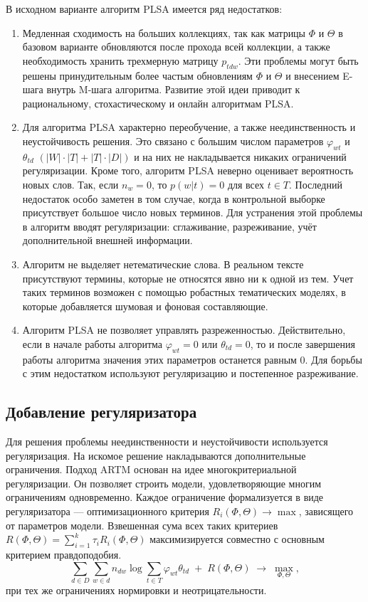 \documentclass[12pt]{article}
\renewcommand{\phi}{\varphi}
\begin{document}
В исходном варианте алгоритм PLSA имеется ряд недостатков:
\begin{enumerate}
\item Медленная сходимость на больших коллекциях, так как матрицы $\Phi$ и $\Theta$ в базовом варианте обновляются после прохода всей коллекции, а также необходимость хранить трехмерную матрицу $p_{tdw}$. Эти проблемы могут быть решены принудительным более частым обновлениям $\Phi$ и $\Theta$ и внесением E-шага внутрь M-шага алгоритма. Развитие этой идеи приводит к рациональному, стохастическому и онлайн алгоритмам PLSA.
\item Для алгоритма PLSA характерно переобучение, а также неединственность и неустойчивость решения. Это связано с большим числом параметров $\phi_{wt}$ и $\theta_{td}$ $(|W|\cdot|T|+|T|\cdot|D|)$ и на них не накладывается никаких ограничений регуляризации. Кроме того, алгоритм PLSA неверно оценивает вероятность новых слов. Так, если $n_w=0$, то $p(w|t)=0$ для всех  $t \in T$. Последний недостаток особо заметен в том случае, когда в контрольной выборке присутствует большое число новых терминов. Для устранения этой проблемы в алгоритм вводят регуляризации: сглаживание, разреживание, учёт дополнительной внешней информации.
\item Алгоритм не выделяет нетематические слова. В реальном тексте присутствуют термины, которые не относятся явно ни к одной из тем. Учет таких терминов возможен с помощью робастных тематических моделях, в которые добавляется шумовая и фоновая составляющие.
\item Алгоритм PLSA не позволяет управлять разреженностью. Действительно, если в начале работы алгоритма $\phi_{wt} = 0$ или $\theta_{td} = 0$, то и после завершения работы алгоритма значения этих параметров останется равным 0. Для борьбы с этим недостатком используют регуляризацию и постепенное разреживание.
\end{enumerate}
	\subsection{Добавление регуляризатора}
Для решения проблемы неединственности и неустойчивости используется регуляризация. На искомое решение накладываются дополнительные ограничения. Подход ARTM \cite{artmdef1, artmdef2, artmdef3} основан на идее многокритериальной регуляризации. Он позволяет строить модели, удовлетворяющие многим ограничениям одновременно. Каждое ограничение формализуется в виде регуляризатора --- оптимизационного критерия $R_i(\Phi,\Theta)\to\max$, зависящего от параметров модели. Взвешенная сума всех таких критериев $R(\Phi,\Theta) = \sum_{i=1}^k \tau_i R_i(\Phi,\Theta)$ максимизируется совместно с основным критерием правдоподобия.
\[
\sum_{d\in D} \sum_{w\in d} n_{dw}\log \sum_{t\in T} \phi_{wt}\theta_{td} \;+\; R(\Phi,\Theta)\;\to\; \max_{\Phi,\Theta},
\]
при тех же ограничениях нормировки и неотрицательности.
\end{document}
